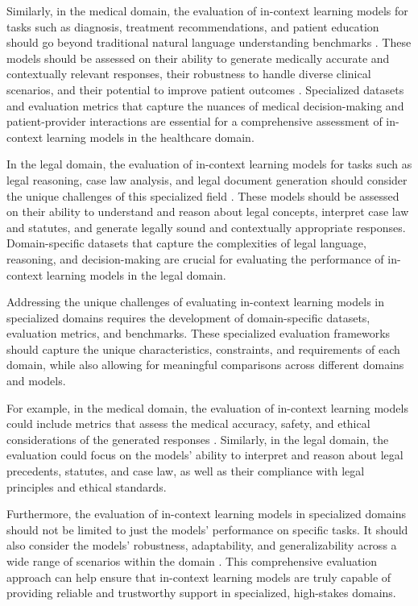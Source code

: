 \documentclass[11pt]{article}
\begin{document}
Similarly, in the medical domain, the evaluation of in-context learning models for tasks such as diagnosis, treatment recommendations, and patient education should go beyond traditional natural language understanding benchmarks \cite{ref301}. These models should be assessed on their ability to generate medically accurate and contextually relevant responses, their robustness to handle diverse clinical scenarios, and their potential to improve patient outcomes \cite{ref302}. Specialized datasets and evaluation metrics that capture the nuances of medical decision-making and patient-provider interactions are essential for a comprehensive assessment of in-context learning models in the healthcare domain.

In the legal domain, the evaluation of in-context learning models for tasks such as legal reasoning, case law analysis, and legal document generation should consider the unique challenges of this specialized field \cite{ref303}. These models should be assessed on their ability to understand and reason about legal concepts, interpret case law and statutes, and generate legally sound and contextually appropriate responses. Domain-specific datasets that capture the complexities of legal language, reasoning, and decision-making are crucial for evaluating the performance of in-context learning models in the legal domain.

Addressing the unique challenges of evaluating in-context learning models in specialized domains requires the development of domain-specific datasets, evaluation metrics, and benchmarks. These specialized evaluation frameworks should capture the unique characteristics, constraints, and requirements of each domain, while also allowing for meaningful comparisons across different domains and models.

For example, in the medical domain, the evaluation of in-context learning models could include metrics that assess the medical accuracy, safety, and ethical considerations of the generated responses \cite{ref304}. Similarly, in the legal domain, the evaluation could focus on the models' ability to interpret and reason about legal precedents, statutes, and case law, as well as their compliance with legal principles and ethical standards.

Furthermore, the evaluation of in-context learning models in specialized domains should not be limited to just the models' performance on specific tasks. It should also consider the models' robustness, adaptability, and generalizability across a wide range of scenarios within the domain \cite{ref49}. This comprehensive evaluation approach can help ensure that in-context learning models are truly capable of providing reliable and trustworthy support in specialized, high-stakes domains.
\end{document}
